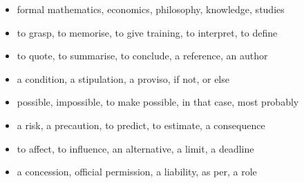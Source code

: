 \begin{itemize}
\raggedright
  \item formal mathematics, economics, philosophy, knowledge, studies
  \item to grasp, to memorise, to give training, to interpret, to define
  \item to quote, to summarise, to conclude, a reference, an author
  \item a condition, a stipulation, a proviso, if not, or else
  \item possible, impossible, to make possible, in that case, most probably
  \item a risk, a precaution, to predict, to estimate, a consequence
  \item to affect, to influence, an alternative, a limit, a deadline
  \item a concession, official permission, a liability, as per, a role
\end{itemize}

